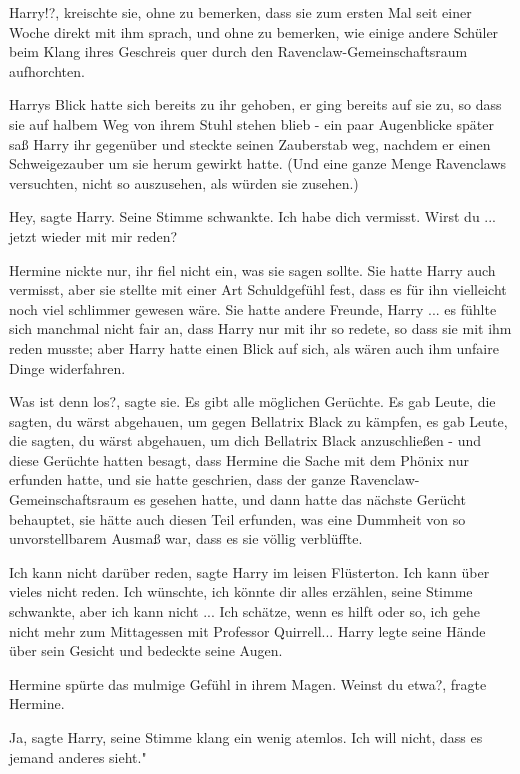 \glqq{}Harry!?\grqq{}, kreischte sie, ohne zu bemerken, dass sie zum ersten Mal
seit einer Woche direkt mit ihm sprach, und ohne zu bemerken, wie einige andere
Schüler beim Klang ihres Geschreis quer durch den Ravenclaw-Gemeinschaftsraum
aufhorchten.

Harrys Blick hatte sich bereits zu ihr gehoben, er ging bereits auf sie zu, so
dass sie auf halbem Weg von ihrem Stuhl stehen blieb - ein paar Augenblicke
später saß Harry ihr gegenüber und steckte seinen Zauberstab weg, nachdem er
einen Schweigezauber um sie herum gewirkt hatte. (Und eine ganze Menge
Ravenclaws versuchten, nicht so auszusehen, als würden sie zusehen.)

\glqq{}Hey\grqq{}, sagte Harry. Seine Stimme schwankte. \glqq{}Ich habe dich
vermisst. Wirst du ... jetzt wieder mit mir reden?\grqq{}

Hermine nickte nur, ihr fiel nicht ein, was sie sagen sollte. Sie hatte Harry
auch vermisst, aber sie stellte mit einer Art Schuldgefühl fest, dass es für ihn
vielleicht noch viel schlimmer gewesen wäre. Sie hatte andere Freunde, Harry ...
es fühlte sich manchmal nicht fair an, dass Harry nur mit ihr so redete, so dass
sie mit ihm reden musste; aber Harry hatte einen Blick auf sich, als wären auch
ihm unfaire Dinge widerfahren.

\glqq{}Was ist denn los?\grqq{}, sagte sie. \glqq{}Es gibt alle möglichen
Gerüchte. Es gab Leute, die sagten, du wärst abgehauen, um gegen Bellatrix Black
zu kämpfen, es gab Leute, die sagten, du wärst abgehauen, um dich Bellatrix
Black anzuschließen -\grqq{} und diese Gerüchte hatten besagt, dass Hermine die
Sache mit dem Phönix nur erfunden hatte, und sie hatte geschrien, dass der ganze
Ravenclaw-Gemeinschaftsraum es gesehen hatte, und dann hatte das nächste Gerücht
behauptet, sie hätte auch diesen Teil erfunden, was eine Dummheit von so
unvorstellbarem Ausmaß war, dass es sie völlig verblüffte.

\glqq{}Ich kann nicht darüber reden\grqq{}, sagte Harry im leisen Flüsterton.
\glqq{}Ich kann über vieles nicht reden. Ich wünschte, ich könnte dir alles
erzählen\grqq{}, seine Stimme schwankte, \glqq{}aber ich kann nicht ... Ich
schätze, wenn es hilft oder so, ich gehe nicht mehr zum Mittagessen mit
Professor Quirrell...\grqq{} Harry legte seine Hände über sein Gesicht und
bedeckte seine Augen.

Hermine spürte das mulmige Gefühl in ihrem Magen. \glqq{}Weinst du etwa?\grqq{},
fragte Hermine.

\glqq{}Ja\grqq{}, sagte Harry, seine Stimme klang ein wenig atemlos. \glqq{}Ich
will nicht, dass es jemand anderes sieht."

